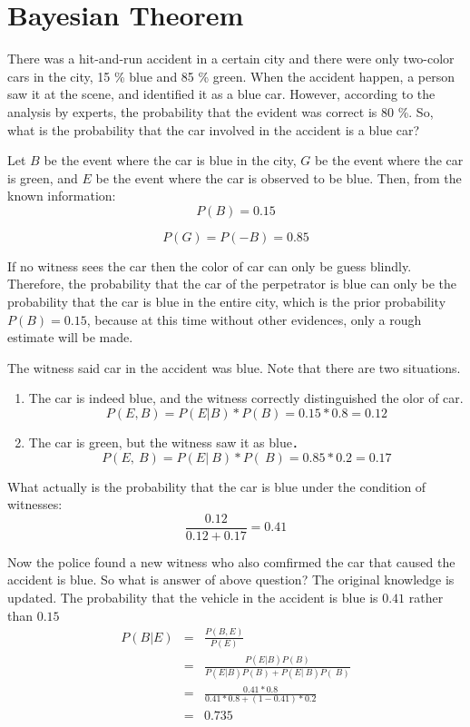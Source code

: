 \section{Bayesian Theorem}\label{}

There was a hit-and-run accident in a certain city and there were only two-color cars in the city, 15 \% blue and 85 \% green. When the accident happen, a person saw it at the scene, and identified it as a blue car. However, according to the analysis by experts, the probability that the evident was correct is 80 \%. So, what is the probability that the car involved in the accident is a blue car?


Let $B$ be the event where the car is blue in the city, $G$ be the event where the car is green, and $E$ be the event where the car is observed to be blue. Then, from the known information:
$$P(B)=0.15$$

$$P(G)=P(-B)=0.85$$


If no witness sees the car then the color of car can only be guess blindly. Therefore, the probability that the car of the perpetrator is blue can only be the probability that the car is blue in the entire city, which is the prior probability $P(B)= 0.15$, because at this time without other evidences, only a rough estimate will be made.


The witness said car in the accident was blue. Note that there are two situations.

\begin{enumerate}
  \item
The car is indeed blue, and the witness correctly distinguished the olor of car.
$$P(E,B) = P(E|B) * P(B) = 0.15 * 0.8 = 0.12$$
\item
The car is green, but the witness saw it as blue．
$$P(E,~B) = P(E|~B) * P(~B) = 0.85 * 0.2 = 0.17$$
\end{enumerate}


What actually is the probability that the car is blue under the condition of witnesses:
$$
\frac{0.12}{0.12+0.17} = 0.41
$$


Now the police found a new witness who also comfirmed the car that caused the accident is blue. So what is answer of above question? The original knowledge is updated. The probability that the vehicle in the accident is blue is  $0.41$ rather than  $0.15$
\begin{eqnarray*}
P(B|E) &=& 　\frac{P(B,E)}{P(E)} \\
& = &  \frac{P(E|B)P(B)}{P(E|B)P(B)+P(E|~B)P(~B)} \\
& = &  \frac{0.41 * 0.8}{ 0.41 *0.8 + (1-0.41)*0.2} \\
& = &  0.735 \\
\end{eqnarray*}

